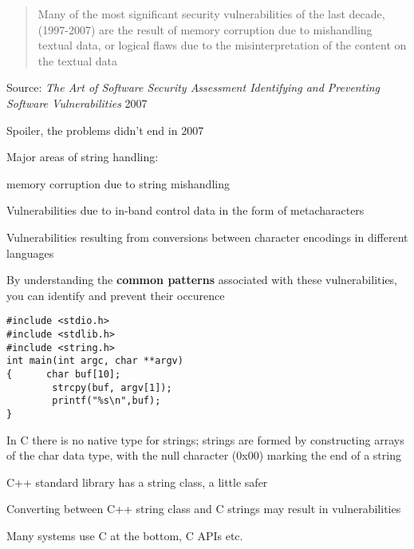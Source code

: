 \documentclass[Screen16to9,17pt]{foils}
\begin{document}

\begin{quote}
Many of the most significant security vulnerabilities of the last decade, (1997-2007) are the result of memory corruption due to mishandling textual data, or logical flaws due to the misinterpretation of the content on the textual data
\end{quote}
Source: \emph{The Art of Software Security Assessment Identifying and Preventing
Software Vulnerabilities} 2007

\begin{list1}
\item Spoiler, the problems didn't end in 2007
\item Major areas of string handling:
\begin{list2}
\item memory corruption due to string mishandling
\item Vulnerabilities due to in-band control data in the form of metacharacters
\item Vulnerabilities resulting from conversions between character encodings in different languages
\end{list2}
\item By understanding the {\bf common patterns} associated with these vulnerabilities, you can identify and prevent their occurence
\end{list1}



\begin{verbatim}
#include <stdio.h>
#include <stdlib.h>
#include <string.h>
int main(int argc, char **argv)
{      char buf[10];
        strcpy(buf, argv[1]);
        printf("%s\n",buf);
}
\end{verbatim}


\begin{list2}
\item In C there is no native type for strings; strings are formed by constructing arrays of the char data type, with the null character (0x00) marking the end of a string
\item C++ standard library has a string class, a little safer
\item Converting between C++ string class and C strings may result in vulnerabilities
\item Many systems use C at the bottom, C APIs etc.
\end{list2}
\end{document}
